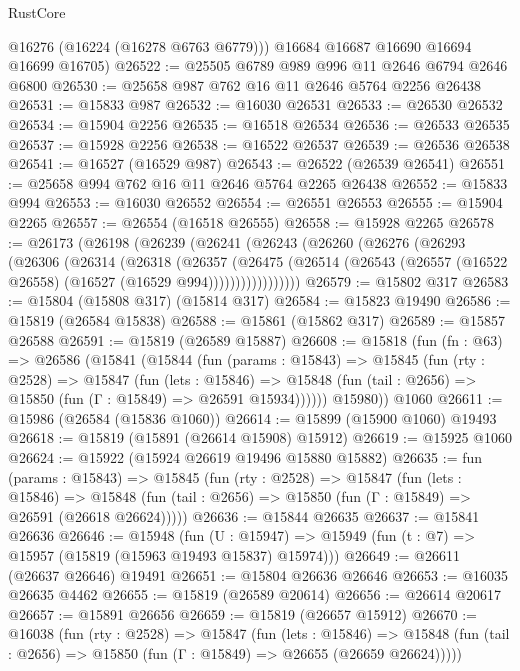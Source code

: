 \begin{lexlean}{RustCore}
\begin{coremodule}
        @16276
        (@16224 (@16278 @6763 @6779)))
      @16684
      @16687
      @16690
      @16694
      @16699
      @16705)
@26522 := @25505 @6789 @989 @996 @11 @2646 @6794 @2646 @6800
@26530 := @25658 @987 @762 @16 @11 @2646 @5764 @2256 @26438
@26531 := @15833 @987
@26532 := @16030 @26531
@26533 := @26530 @26532
@26534 := @15904 @2256
@26535 := @16518 @26534
@26536 := @26533 @26535
@26537 := @15928 @2256
@26538 := @16522 @26537
@26539 := @26536 @26538
@26541 := @16527 (@16529 @987)
@26543 := @26522 (@26539 @26541)
@26551 := @25658 @994 @762 @16 @11 @2646 @5764 @2265 @26438
@26552 := @15833 @994
@26553 := @16030 @26552
@26554 := @26551 @26553
@26555 := @15904 @2265
@26557 := @26554 (@16518 @26555)
@26558 := @15928 @2265
@26578 := @26173
    (@26198
      (@26239
        (@26241
          (@26243
            (@26260
              (@26276
                (@26293
                  (@26306
                    (@26314
                      (@26318
                        (@26357
                          (@26475
                            (@26514
                              (@26543 (@26557 (@16522 @26558) (@16527 (@16529 @994)))))))))))))))))
@26579 := @15802 @317
@26583 := @15804 (@15808 @317) (@15814 @317)
@26584 := @15823 @19490
@26586 := @15819 (@26584 @15838)
@26588 := @15861 (@15862 @317)
@26589 := @15857 @26588
@26591 := @15819 (@26589 @15887)
@26608 := @15818
    (fun (fn : @63) =>
    @26586
      (@15841
        (@15844
          (fun (params : @15843) =>
          @15845
            (fun (rty : @2528) =>
            @15847
              (fun (lets : @15846) =>
              @15848 (fun (tail : @2656) => @15850 (fun (Γ : @15849) => @26591 @15934))))))
        @15980))
    @1060
@26611 := @15986 (@26584 (@15836 @1060))
@26614 := @15899 (@15900 @1060) @19493
@26618 := @15819 (@15891 (@26614 @15908) @15912)
@26619 := @15925 @1060
@26624 := @15922 (@15924 @26619 @19496 @15880 @15882)
@26635 := fun (params : @15843) =>
  @15845
    (fun (rty : @2528) =>
    @15847
      (fun (lets : @15846) =>
      @15848 (fun (tail : @2656) => @15850 (fun (Γ : @15849) => @26591 (@26618 @26624)))))
@26636 := @15844 @26635
@26637 := @15841 @26636
@26646 := @15948
    (fun (U : @15947) => @15949 (fun (t : @7) => @15957 (@15819 (@15963 @19493 @15837) @15974)))
@26649 := @26611 (@26637 @26646) @19491
@26651 := @15804 @26636 @26646
@26653 := @16035 @26635 @4462
@26655 := @15819 (@26589 @20614)
@26656 := @26614 @20617
@26657 := @15891 @26656
@26659 := @15819 (@26657 @15912)
@26670 := @16038
    (fun (rty : @2528) =>
    @15847
      (fun (lets : @15846) =>
      @15848 (fun (tail : @2656) => @15850 (fun (Γ : @15849) => @26655 (@26659 @26624)))))

\end{coremodule}
\end{lexlean}
